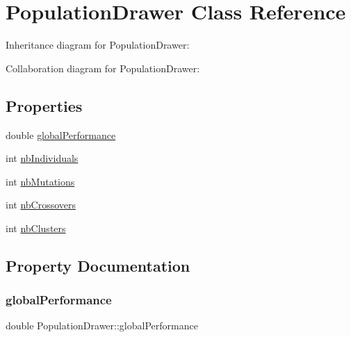 \hypertarget{class_population_drawer}{}\section{Population\+Drawer Class Reference}
\label{class_population_drawer}


Inheritance diagram for Population\+Drawer\+:


Collaboration diagram for Population\+Drawer\+:
\subsection*{Properties}
\begin{DoxyCompactItemize}
\item 
double \hyperlink{class_population_drawer_ace13431d21d20767a0dfb5f96352d49c}{global\+Performance}
\item 
int \hyperlink{class_population_drawer_af20bdfe73e9bda7aba2257a101771071}{nb\+Individuals}
\item 
int \hyperlink{class_population_drawer_ae31d2743689e0cca64420d05fa120bda}{nb\+Mutations}
\item 
int \hyperlink{class_population_drawer_acb640608b088ecc9fe64fb31bc00f91e}{nb\+Crossovers}
\item 
int \hyperlink{class_population_drawer_ab4a61ab4b7eec14ea88057d1673ec424}{nb\+Clusters}
\end{DoxyCompactItemize}


\subsection{Property Documentation}
\mbox{\label{class_population_drawer_ace13431d21d20767a0dfb5f96352d49c}} 
\subsubsection{\texorpdfstring{global\+Performance}{globalPerformance}}
{\footnotesize\ttfamily double Population\+Drawer\+::global\+Performance}

\mbox{\label{class_population_drawer_ab4a61ab4b7eec14ea88057d1673ec424}} 
